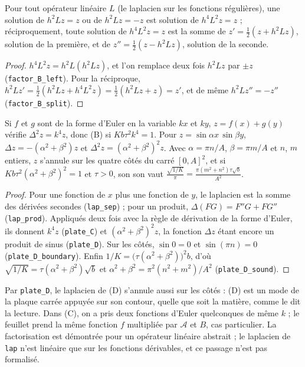 \begin{enonce}
Pour tout opérateur linéaire $L$ (le laplacien sur les fonctions régulières), une solution de $h^2Lz = z$ ou de $h^2Lz = -z$ est solution de $h^4L^2z = z$ ; réciproquement, toute solution de $h^4L^2z = z$ est la somme de $z' = \frac12(z + h^2Lz)$, solution de la première, et de $z'' = \frac12(z - h^2Lz)$, solution de la seconde.
\end{enonce}

\begin{proof}
$h^4L^2z = h^2L(h^2Lz)$, et l'on remplace deux fois $h^2Lz$ par $\pm z$ (\texttt{factor\_B\_left}). Pour la réciproque, $h^2Lz' = \frac12(h^2Lz + h^4L^2z) = \frac12(h^2Lz + z) = z'$, et de même $h^2Lz'' = -z''$ (\texttt{factor\_B\_split}).
\end{proof}

\begin{enonce}
Si $f$ et $g$ sont de la forme d'Euler en la variable $kx$ et $ky$, $z = f(x) + g(y)$ vérifie $\Delta^2 z = k^4 z$, donc (B) si $Kb\tau^2k^4 = 1$. Pour $z = \sin\alpha x\,\sin\beta y$, $\Delta z = -(\alpha^2 + \beta^2)z$ et $\Delta^2 z = (\alpha^2 + \beta^2)^2z$. Avec $\alpha = \pi n/A$, $\beta = \pi m/A$ et $n$, $m$ entiers, $z$ s'annule sur les quatre côtés du carré $[0, A]^2$, et si $Kb\tau^2(\alpha^2 + \beta^2)^2 = 1$ et $\tau > 0$, son son vaut $\frac{\sqrt{1/K}}{\pi} = \frac{\pi(m^2 + n^2)\tau\sqrt b}{A^2}$.
\end{enonce}

\begin{proof}
Pour une fonction de $x$ plus une fonction de $y$, le laplacien est la somme des dérivées secondes (\texttt{lap\_sep}) ; pour un produit, $\Delta(FG) = F''G + FG''$ (\texttt{lap\_prod}). Appliqués deux fois avec la règle de dérivation de la forme d'Euler, ils donnent $k^4z$ (\texttt{plate\_C}) et $(\alpha^2+\beta^2)^2z$, la fonction $\Delta z$ étant encore un produit de sinus (\texttt{plate\_D}). Sur les côtés, $\sin 0 = 0$ et $\sin(\pi n) = 0$ (\texttt{plate\_D\_boundary}). Enfin $1/K = \bigl(\tau(\alpha^2+\beta^2)\bigr)^2 b$, d'où $\sqrt{1/K} = \tau(\alpha^2+\beta^2)\sqrt b$ et $\alpha^2 + \beta^2 = \pi^2(n^2+m^2)/A^2$ (\texttt{plate\_D\_sound}).
\end{proof}

\begin{remarque}
Par \texttt{plate\_D}, le laplacien de (D) s'annule aussi sur les côtés : (D) est un mode de la plaque carrée appuyée sur son contour, quelle que soit la matière, comme le dit la lecture. Dans (C), on a pris deux fonctions d'Euler quelconques de même $k$ ; le feuillet prend la même fonction $f$ multipliée par $\mathcal A$ et $B$, cas particulier. La factorisation est démontrée pour un opérateur linéaire abstrait ; le laplacien de \texttt{lap} n'est linéaire que sur les fonctions dérivables, et ce passage n'est pas formalisé.
\end{remarque}

